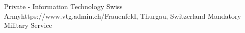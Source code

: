 \begin{CV}
        {Private - Information Technology}
        {Swiss Army}{https://www.vtg.admin.ch/}{Frauenfeld, Thurgau, Switzerland}
        {Mandatory Military Service}
\end{CV}